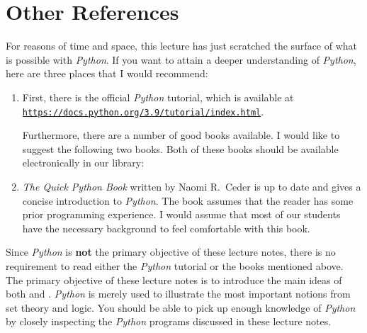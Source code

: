 \section{Other References}
For reasons of time and space, this lecture has just scratched the surface of what is possible with
\textsl{Python}.  If you want to attain a deeper understanding of \textsl{Python}, here are three places that 
I would recommend:
\begin{enumerate}
\item First, there is the official \textsl{Python} tutorial, which is available at
      \\[0.2cm]
      \hspace*{1.3cm}
      \href{https://docs.python.org/3.9/tutorial/index.html}{\texttt{https://docs.python.org/3.9/tutorial/index.html}}.

      Furthermore, there are a number of good books available.  I would like to suggest the following two
      books.  Both of these books should be available electronically in our library:
\item \emph{The Quick Python Book} written by Naomi R.~Ceder \cite{ceder:2018} is up to date and gives a
      concise introduction to \textsl{Python}.  The book assumes that the reader has some prior programming
      experience.  I would assume that most of our students have the necessary background to feel comfortable
      with this book.
\end{enumerate}
Since \textsl{Python} is \textbf{not} the primary objective of these lecture notes, there is no requirement to read
either the \textsl{Python} tutorial or the books mentioned above.  The primary objective of these
lecture notes is to introduce the main ideas of both  and .
\textsl{Python} is merely used to illustrate the most important notions from set theory and logic.  You should
be able to pick up enough knowledge of \textsl{Python} by closely inspecting the \textsl{Python} programs
discussed in these lecture notes.  


